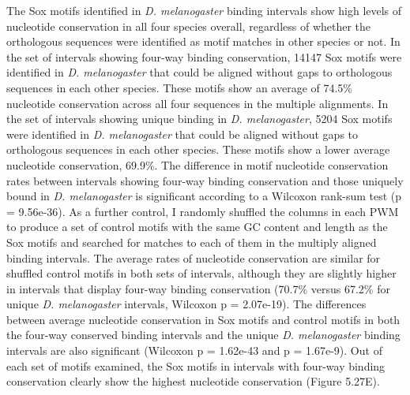 The Sox motifs identified in \emph{D. melanogaster} binding intervals show high levels of nucleotide conservation in all four species overall, regardless of whether the orthologous sequences were identified as motif matches in other species or not. In the set of intervals showing four-way binding conservation, 14147 Sox motifs were identified in \emph{D. melanogaster} that could be aligned without gaps to orthologous sequences in each other species. These motifs show an average of 74.5\% nucleotide conservation across all four sequences in the multiple alignments. In the set of intervals showing unique binding in \emph{D. melanogaster}, 5204 Sox motifs were identified in \emph{D. melanogaster} that could be aligned without gaps to orthologous sequences in each other species. These motifs show a lower average nucleotide conservation, 69.9\%. The difference in motif nucleotide conservation rates between intervals showing four-way binding conservation and those uniquely bound in \emph{D. melanogaster} is significant according to a Wilcoxon rank-sum test (p = 9.56e-36). As a further control, I randomly shuffled the columns in each PWM to produce a set of control motifs with the same GC content and length as the Sox motifs and searched for matches to each of them in the multiply aligned binding intervals. The average rates of nucleotide conservation are similar for shuffled control motifs in both sets of intervals, although they are slightly higher in intervals that display four-way binding conservation (70.7\% versus 67.2\% for unique \emph{D. melanogaster} intervals, Wilcoxon p = 2.07e-19). The differences between average nucleotide conservation in Sox motifs and control motifs in both the four-way conserved binding intervals and the unique \emph{D. melanogaster} binding intervals are also significant (Wilcoxon p = 1.62e-43
 and p = 1.67e-9). Out of each set of motifs examined, the Sox motifs in intervals with four-way binding conservation clearly show the highest nucleotide conservation (Figure 5.27E).\\

